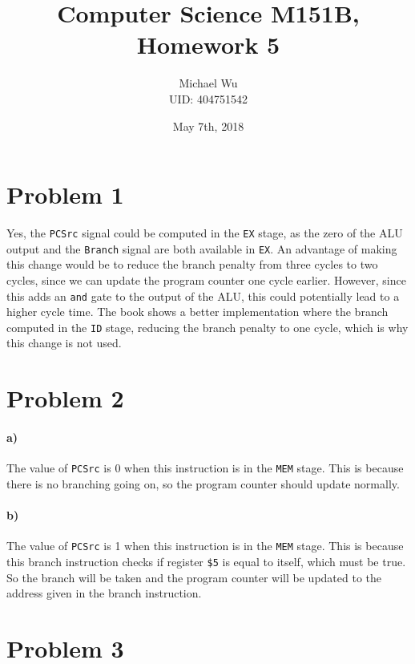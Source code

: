 \documentclass[12pt]{article}
\begin{document}
\title{Computer Science M151B, Homework 5}
\date{May 7th, 2018}
\author{Michael Wu\\UID: 404751542}
\maketitle

\section*{Problem 1}

Yes, the \texttt{PCSrc} signal could be computed in the \texttt{EX} stage, as the zero of the ALU output and the \texttt{Branch} signal are both
available in \texttt{EX}. An advantage of making this change would be to reduce the branch penalty from three cycles to two cycles, since we can
update the program counter one cycle earlier. However, since this adds an \texttt{and} gate to the output of the ALU, this could potentially
lead to a higher cycle time. The book shows a better implementation where the branch computed in the \texttt{ID} stage, reducing the branch penalty
to one cycle, which is why this change is not used.

\section*{Problem 2}

\paragraph{a)}

The value of \texttt{PCSrc} is 0 when this instruction is in the \texttt{MEM} stage. This is because there is no branching going on, so the program counter
should update normally.

\paragraph{b)}

The value of \texttt{PCSrc} is 1 when this instruction is in the \texttt{MEM} stage. This is because this branch instruction checks if register \texttt{\$5}
is equal to itself, which must be true. So the branch will be taken and the program counter will be updated to the address given in the branch instruction.

\section*{Problem 3}
\end{document}

